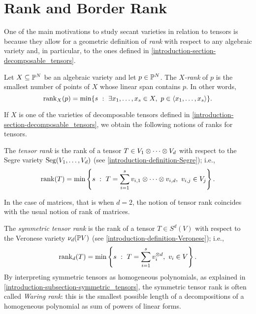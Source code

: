 \section{Rank and Border Rank}
\label{classicalAG-section-rank}

One of the main motivations to study secant varieties in relation to tensors is because they allow for a geometric definition of {\it rank} with respect to any algebraic variety and, in particular, to the ones defined in \ref{introduction-section-decomposable_tensors}.

\begin{definition}
\label{classicalAG-definition-Xrank}
    Let $X \subseteq \mathbb{P}^N$ be an algebraic variety and let $p \in \mathbb{P}^N$. The \emph{$X$-rank} of $p$ is the smallest number of points of $X$ whose linear span contains $p$. In other words,
    \[
        \mathrm{rank}_X(p) = \min\{s ~:~ \exists x_1,\ldots,x_s \in X, ~ p \in \langle x_1,\ldots,x_s \rangle\}.
    \]
\end{definition}

If $X$ is one of the varieties of decomposable tensors defined in \ref{introduction-section-decomposable_tensors}, we obtain the following notions of ranks for tensors.

\begin{definition}
\label{classicalAG-definition-tensor_rank}
    The \emph{tensor rank} is the rank of a tensor $T \in V_1 \otimes \cdots \otimes V_d$ with respect to the Segre variety $\mathrm{Seg}(V_1,\ldots,V_d)$ (see \ref{introduction-definition-Segre}); i.e., 
    \[
        \mathrm{rank}(T) = \min\left\{s ~:~ T = \sum_{i=1}^s v_{i,1}\otimes \cdots \otimes v_{i,d}, ~ v_{i,j} \in V_j\right\}.
    \]
    \begin{example}
        In the case of matrices, that is when $d=2$, the notion of tensor rank coincides with the usual notion of rank of matrices.
    \end{example}
\end{definition}

\begin{definition}
\label{classicalAG-definition-symmetric_tensor_rank}
    The \emph{symmetric tensor rank} is the rank of a tensor $T \in S^d(V)$ with respect to the Veronese variety $\nu_d(\mathbb{P} V)$ (see \ref{introduction-definition-Veronese}); i.e., 
    \[
        \mathrm{rank}_d(T) = \min\left\{s ~:~ T = \sum_{i=1}^s v_{i}^{\otimes d}, ~ v_{i} \in V\right\}.
    \]
    By interpreting symmetric tensors as homogeneous polynomials, as explained in \ref{introduction-subsection-symmetric_tensors}, the symmetric tensor rank is often called \emph{Waring rank}: this is the smallest possible length of a decompositions of a homogeneous polynomial as sum of powers of linear forms.
\end{definition}  

